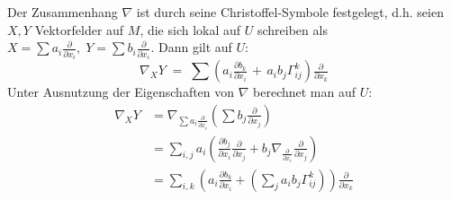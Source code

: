 \documentclass[%
	paper=a5,%
	fleqn,%
	DIV=18,%
	BCOR=0mm,
	fontsize=11pt,
	titlepage=false,%
	bibliography=totoc,
	DIV=18,%
	twoside=true,
	pdftitle=Riemannsche Geometrie,
	pdfauthor=Uwe Semmelmann,
	numbers=noendperiod]%
	{scrbook}
\begin{document}
\bigskip

\begin{rem*}
Der Zusammenhang $\nabla$ ist durch seine Christoffel-Symbole festgelegt, d.h.
seien $X, Y$ Vektorfelder auf $M$, die sich lokal auf $U$ schreiben als
$
X = \sum a_i \tfrac{\partial }{\partial x_i}, \; 
Y = \sum b_i \tfrac{\partial }{\partial x_i} 
$.
Dann gilt auf $U$:
$$
\nabla_XY \;=\; \sum \left( a_i \tfrac{\partial b_k}{\partial x_i}
\,+\,a_i b_j \Gamma^k_{ij} \right) \tfrac{\partial }{\partial x_k}
$$
Unter Ausnutzung der Eigenschaften von $\nabla$ berechnet man auf $U$:
\begin{align*}
\nabla_XY
& = 
\nabla_{ \sum a_i \tfrac{\partial }{\partial x_i} } \left( \sum b_j
\tfrac{\partial }{\partial x_j}\right)\\[1.5ex]
& = \sum_{i,j} a_i
\left(\frac{\partial b_j}{\partial x_i}\frac{\partial}{\partial x_j}+
b_j\nabla_{\tfrac{\partial}{\partial x_i}}\frac{\partial}{\partial x_j}
\right)\\
&= 
\sum_{i,k} 
\left(a_i\frac{\partial b_k}{\partial x_i} + 
\left(\sum_j a_i b_j \Gamma_{ij}^k\right)
\right)\frac{\partial}{\partial x_k}
% 
% 
\end{align*}
\end{rem*}

\bigskip
\end{document}
